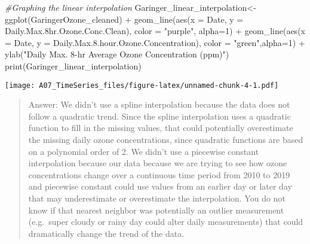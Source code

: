 \documentclass[
]{article}
\newenvironment{Shaded}{\begin{snugshade}}{\end{snugshade}}
\newcommand{\AttributeTok}[1]{\textcolor[rgb]{0.77,0.63,0.00}{#1}}
\newcommand{\CommentTok}[1]{\textcolor[rgb]{0.56,0.35,0.01}{\textit{#1}}}
\newcommand{\DecValTok}[1]{\textcolor[rgb]{0.00,0.00,0.81}{#1}}
\newcommand{\FloatTok}[1]{\textcolor[rgb]{0.00,0.00,0.81}{#1}}
\newcommand{\FunctionTok}[1]{\textcolor[rgb]{0.00,0.00,0.00}{#1}}
\newcommand{\NormalTok}[1]{#1}
\newcommand{\OtherTok}[1]{\textcolor[rgb]{0.56,0.35,0.01}{#1}}
\newcommand{\SpecialCharTok}[1]{\textcolor[rgb]{0.00,0.00,0.00}{#1}}
\newcommand{\StringTok}[1]{\textcolor[rgb]{0.31,0.60,0.02}{#1}}
\begin{document}
\begin{Shaded}
\begin{Highlighting}[]
\CommentTok{\#Graphing the linear interpolation}
\NormalTok{Garinger\_linear\_interpolation}\OtherTok{\textless{}{-}}\FunctionTok{ggplot}\NormalTok{(GaringerOzone\_cleaned) }\SpecialCharTok{+}
                                      \FunctionTok{geom\_line}\NormalTok{(}\FunctionTok{aes}\NormalTok{(}\AttributeTok{x =}\NormalTok{ Date, }
                                      \AttributeTok{y =}\NormalTok{ Daily.Max}\FloatTok{.8}\NormalTok{hr.Ozone.Conc.Clean), }
                                      \AttributeTok{color =} \StringTok{"purple"}\NormalTok{, }\AttributeTok{alpha=}\DecValTok{1}\NormalTok{) }\SpecialCharTok{+}
                                      \FunctionTok{geom\_line}\NormalTok{(}\FunctionTok{aes}\NormalTok{(}\AttributeTok{x =}\NormalTok{ Date, }
                                      \AttributeTok{y =}\NormalTok{ Daily.Max.}\FloatTok{8.}\NormalTok{hour.Ozone.Concentration),}
                                      \AttributeTok{color =} \StringTok{"green"}\NormalTok{,}\AttributeTok{alpha=}\DecValTok{1}\NormalTok{) }\SpecialCharTok{+}
                    \FunctionTok{ylab}\NormalTok{(}\StringTok{"Daily Max. 8{-}hr Average Ozone Concentration (ppm)"}\NormalTok{)}
\FunctionTok{print}\NormalTok{(Garinger\_linear\_interpolation)}
\end{Highlighting}
\end{Shaded}

\texttt{[image: A07\_TimeSeries\_files/figure-latex/unnamed-chunk-4-1.pdf]}

\begin{quote}
Answer: We didn't use a spline interpolation because the data does not
follow a quadratic trend. Since the spline interpolation uses a
quadratic function to fill in the missing values, that could potentially
overestimate the missing daily ozone concentrations, since quadratic
functions are based on a polynomial order of 2. We didn't use a
piecewise constant interpolation because our data because we are trying
to see how ozone concentrations change over a continuous time period
from 2010 to 2019 and piecewise constant could use values from an
earlier day or later day that may underestimate or overestimate the
interpolation. You do not know if that nearest neighbor was potentially
an outlier measurement (e.g.~super cloudy or rainy day could alter daily
measurements) that could dramatically change the trend of the data.
\end{quote}
\end{document}
